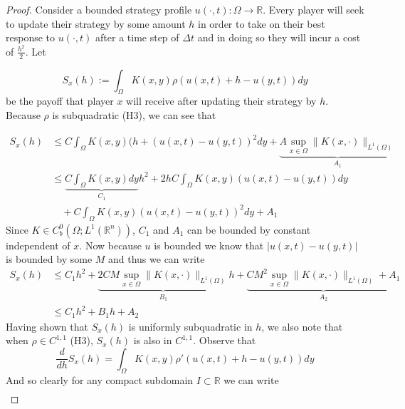\documentclass[10pt,a4paper]{amsart}
\begin{document}
    \begin{proof}
        Consider a bounded strategy profile $u(\cdot, t):\Omega\to \mathbb{R}$. Every player will seek to update their strategy by some amount $h$ in order to take on their best response to $u(\cdot, t)$ after a time step of $\Delta t$ and in doing so they will incur a cost of $\frac{h^2}{2}$. Let 
        
       \[S_x(h):=\int_\Omega K(x,y)\rho(u(x,t)+h-u(y,t))dy\] be the payoff that player $x$ will receive after updating their strategy by $h$. Because $\rho$ is subquadratic (H3), we can see that 

        \begin{equation*}
        \begin{split}
            S_x(h)&\leq C\int_\Omega K(x,y)(h+(u(x,t)-u(y,t))^2dy+\underbrace{A\sup_{x\in\Omega}\|K(x,\cdot)\|_{L^1(\Omega)}}_{A_1}\\
            &\leq \underbrace{C\int_\Omega K(x,y)dy}_{C_1}h^2 + 2hC\int_\Omega K(x,y)(u(x,t)-u(y,t))dy\\
            &\quad +C\int_\Omega K(x,y)(u(x,t)-u(y,t))^2dy+A_1
        \end{split}
        \end{equation*}
        Since $K\in C_b^0(\Omega; L^1(\mathbb{R}^n))$, $C_1$ and $A_1$ can be bounded by constant independent of $x$. Now because $u$ is bounded we know that $|u(x,t)-u(y,t)|$ is bounded by some $M$ and thus we can write 
        \begin{equation*}
            \begin{split}
                S_x(h)&\leq C_1h^2+\underbrace{2CM\sup_{x\in\Omega}\|K(x,\cdot)\|_{L^1(\Omega)}}_{B_1}h+ \underbrace{CM^2\sup_{x\in\Omega}\|K(x,\cdot )\|_{L^1(\Omega)} + A_1}_{A_2}\\
                &\leq C_1h^2+B_1h+A_2
            \end{split}
        \end{equation*}
        Having shown that $S_x(h)$ is uniformly subquadratic in $h$, we also note that when $\rho\in C^{1,1}$ (H3), $S_x(h)$ is also in $C^{1,1}$. Observe that 
        \begin{equation*}
            \frac{d}{dh}S_x(h)=\int_\Omega K(x,y)\rho'(u(x,t)+h-u(y,t))dy
        \end{equation*}
        And so clearly for any compact subdomain $I\subset \mathbb{R}$ we can write 
        \begin{equation}\label{EQ:SinC11}
        \begin{split}

\end{split}
\end{equation}
\end{proof}
\end{document}
